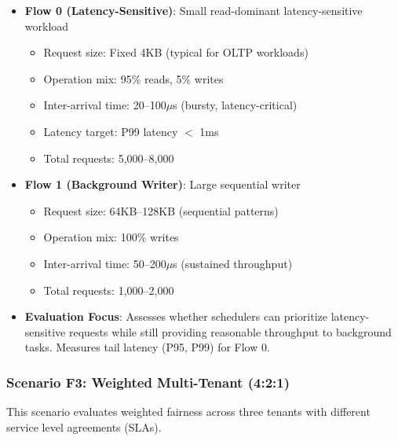 \documentclass[11pt]{article}
\begin{document}
\begin{itemize}
    \item \textbf{Flow 0 (Latency-Sensitive)}: Small read-dominant latency-sensitive workload
    \begin{itemize}
        \item Request size: Fixed 4KB (typical for OLTP workloads)
        \item Operation mix: 95\% reads, 5\% writes
        \item Inter-arrival time: 20--100$\mu$s (bursty, latency-critical)
        \item Latency target: P99 latency $<$ 1ms
        \item Total requests: 5,000--8,000
    \end{itemize}
    \item \textbf{Flow 1 (Background Writer)}: Large sequential writer
    \begin{itemize}
        \item Request size: 64KB--128KB (sequential patterns)
        \item Operation mix: 100\% writes
        \item Inter-arrival time: 50--200$\mu$s (sustained throughput)
        \item Total requests: 1,000--2,000
    \end{itemize}
    \item \textbf{Evaluation Focus}: Assesses whether schedulers can prioritize latency-sensitive requests while still providing reasonable throughput to background tasks. Measures tail latency (P95, P99) for Flow 0.
\end{itemize}

\subsubsection{Scenario F3: Weighted Multi-Tenant (4:2:1)}

This scenario evaluates weighted fairness across three tenants with different service level agreements (SLAs).
\end{document}
